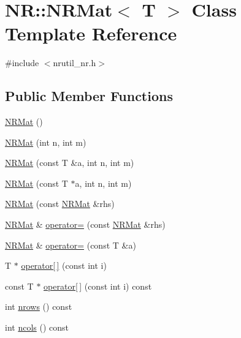\hypertarget{classNR_1_1NRMat}{}\section{NR\+:\+:N\+R\+Mat$<$ T $>$ Class Template Reference}
\label{classNR_1_1NRMat}


{\ttfamily \#include $<$nrutil\+\_\+nr.\+h$>$}

\subsection*{Public Member Functions}
\begin{DoxyCompactItemize}
\item 
\mbox{\hyperlink{classNR_1_1NRMat_abcaca2687429fc0f26cde34647f7c981}{N\+R\+Mat}} ()
\item 
\mbox{\hyperlink{classNR_1_1NRMat_a52799868d76fb74a2d73b8d8291a9215}{N\+R\+Mat}} (int n, int m)
\item 
\mbox{\hyperlink{classNR_1_1NRMat_a31a0ecf81920c576b25e3c49bfa5e444}{N\+R\+Mat}} (const T \&a, int n, int m)
\item 
\mbox{\hyperlink{classNR_1_1NRMat_a30ddcc485a9e735b1fafbb56022fdc3a}{N\+R\+Mat}} (const T $\ast$a, int n, int m)
\item 
\mbox{\hyperlink{classNR_1_1NRMat_a7ad1dc6f56c44d5d0a7b595d48206cfa}{N\+R\+Mat}} (const \mbox{\hyperlink{classNR_1_1NRMat}{N\+R\+Mat}} \&rhs)
\item 
\mbox{\hyperlink{classNR_1_1NRMat}{N\+R\+Mat}} \& \mbox{\hyperlink{classNR_1_1NRMat_a3cb82862ba2a5cff2516bd1c7ff517ef}{operator=}} (const \mbox{\hyperlink{classNR_1_1NRMat}{N\+R\+Mat}} \&rhs)
\item 
\mbox{\hyperlink{classNR_1_1NRMat}{N\+R\+Mat}} \& \mbox{\hyperlink{classNR_1_1NRMat_aa8efc1ec6e359056021124611896357b}{operator=}} (const T \&a)
\item 
T $\ast$ \mbox{\hyperlink{classNR_1_1NRMat_aec79531b03f93f4a77b3f4aa534a61a5}{operator\mbox{[}$\,$\mbox{]}}} (const int i)
\item 
const T $\ast$ \mbox{\hyperlink{classNR_1_1NRMat_aa45509152cfe7c8214521e8c5a98733a}{operator\mbox{[}$\,$\mbox{]}}} (const int i) const
\item 
int \mbox{\hyperlink{classNR_1_1NRMat_aacebd802ca3dea0e0079a8dd27f7102c}{nrows}} () const
\item 
int \mbox{\hyperlink{classNR_1_1NRMat_ad6c5ecfb47d80c934bedeb7ea395fd84}{ncols}} () const
\item 

\end{DoxyCompactItemize}
